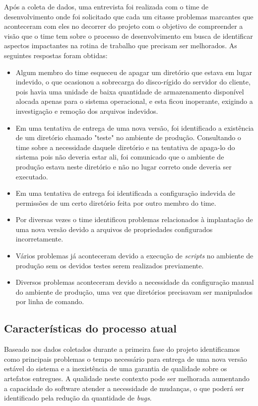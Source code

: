 \documentclass[
	12pt,				%
	openright,			%
	twoside,			%
	a4paper,			%
	english,			%
	french,				%
	spanish,			%
	brazil,				%
	]{abntex2}
\begin{document}
Após a coleta de dados, uma entrevista foi realizada com o time de desenvolvimento onde foi solicitado que cada um citasse problemas marcantes que aconteceram com eles no decorrer do projeto com o objetivo de compreender a visão que o time tem sobre o processo de desenvolvimento em busca de identificar aspectos impactantes na rotina de trabalho que precisam ser melhorados. As seguintes respostas foram obtidas:

\begin{itemize}  
	\item Algum membro do time esqueceu de apagar um diretório que estava em lugar indevido, o que ocasionou a sobrecarga do disco-rígido do servidor do cliente, pois havia uma unidade de baixa quantidade de armazenamento disponível alocada apenas para o sistema operacional, e esta ficou inoperante, exigindo a investigação e remoção dos arquivos indevidos.
	\item Em uma tentativa de entrega de uma nova versão, foi identificado a existência de um diretório chamado "teste" no ambiente de produção. Consultando o time sobre a necessidade daquele diretório e na tentativa de apaga-lo do sistema pois não deveria estar ali, foi comunicado que o ambiente de produção estava neste diretório e não no lugar correto onde deveria ser executado.
	\item Em uma tentativa de entrega foi identificada a configuração indevida de permissões de um certo diretório feita por outro membro do time.
	\item Por diversas vezes o time identificou problemas relacionados à implantação de uma nova versão devido a arquivos de propriedades configurados incorretamente.
	\item Vários problemas já aconteceram devido a execução de \textit{scripts} no ambiente de produção sem os devidos testes serem realizados previamente.
	\item Diversos problemas aconteceram devido a necessidade da configuração manual do ambiente de produção, uma vez que diretórios precisavam ser manipulados por linha de comando.
\end{itemize}

\subsection{Características do processo atual} 

Baseado nos dados coletados durante a primeira fase do projeto identificamos como principais problemas o tempo necessário para entrega de uma nova versão estável do sistema e a inexistência de uma garantia de qualidade sobre os artefatos entregues. A qualidade neste contexto pode ser melhorada aumentando a capacidade do software atender a necessidade de mudanças, o que poderá ser identificado pela redução da quantidade de \textit{bugs}.
\end{document}
